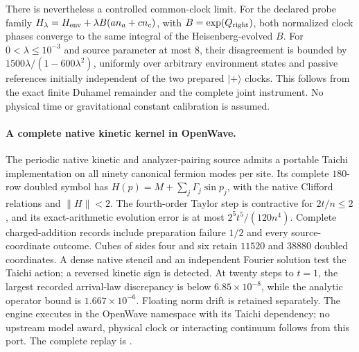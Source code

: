 There is nevertheless a controlled common-clock limit. For the declared probe family $H_\lambda=H_{\rm env}+\lambda B(a n_a+c n_c)$, with $B=\exp(Q_{\rm right})$, both normalized clock phases converge to the same integral of the Heisenberg-evolved $B$. For $0<\lambda\leq10^{-3}$ and source parameter at most $8$, their disagreement is bounded by $1500\lambda/(1-600\lambda^2)$, uniformly over arbitrary environment states and passive references initially independent of the two prepared $|+\rangle$ clocks. This follows from the exact finite Duhamel remainder and the complete joint instrument. No physical time or gravitational constant calibration is assumed.


\paragraph{A complete native kinetic kernel in OpenWave.}
The periodic native kinetic and analyzer-pairing source admits a portable
Taichi implementation on all ninety canonical fermion modes per site.
Its complete $180$-row doubled symbol has
$H(p)=M+\sum_j\Gamma_j\sin p_j$, with the native Clifford relations and
$\|H\|<2$. The fourth-order Taylor step is contractive for
$2t/n\leq2$, and its exact-arithmetic evolution error is at most
$2^5t^5/(120n^4)$. Complete charged-addition records include preparation
failure $1/2$ and every source-coordinate outcome. Cubes of sides four
and six retain $11520$ and $38880$ doubled coordinates. A dense native
stencil and an independent Fourier solution test the Taichi action;
a reversed kinetic sign is detected. At twenty steps to $t=1$,
the largest recorded arrival-law discrepancy is below
$6.85\times10^{-8}$, while the analytic operator bound is
$1.667\times10^{-6}$. Floating norm drift is retained separately.
The engine executes in the OpenWave namespace with its Taichi dependency;
no upstream model award, physical clock or interacting continuum follows
from this port. The complete replay is
.
